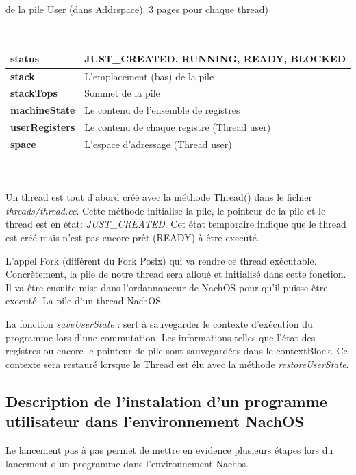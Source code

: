 \documentclass[a4paper,10pt]{article}
\begin{document}
de la pile
User (dans Addrspace). 3 pages pour chaque thread)

\vspace{0.3cm} \\
\begin{tabular}{|l|l|}
\hline 
 \textbf{status} & JUST\_CREATED, RUNNING, READY, BLOCKED \\ \hline 
 \textbf{stack}& L'emplacement (bas) de la pile \\ \hline
 \textbf{stackTops}& Sommet de la pile \\ \hline
 \textbf{machineState}&Le contenu de l'ensemble de registres \\ \hline
 \textbf{userRegisters} &Le contenu de chaque registre (Thread user) \\ \hline
 \textbf{space}& L'espace d'adressage (Thread user) \\ \hline
\end{tabular} \\
\vspace{0.2cm} \\

Un thread est tout d'abord créé avec la méthode Thread() dans le fichier 
\textit{threads/thread.cc}. Cette méthode initialise la pile, le pointeur de la 
pile et le thread est en état: \textit{JUST\_CREATED}. Cet état temporaire indique
que le thread est créé mais n'est pas encore prêt (READY) à être executé. 

L'appel Fork (différent du Fork Posix) qui va rendre ce
thread exécutable. Concrètement, la pile de notre thread sera alloué et 
initialisé dans cette fonction. Il va être ensuite mise dans l'ordannanceur de NachOS
pour qu'il puisse être executé. La pile d'un thread NachOS

La fonction \textit{saveUserState} : sert à sauvegarder le contexte d'exécution
du programme lors d'une commutation. Les informations telles que l'état des
registres ou encore le pointeur de pile sont sauvegardées dans le contextBlock.
Ce contexte sera restauré lorsque le Thread est élu avec la méthode
\textit{restoreUserState}.

\subsection{Description de l'instalation d'un programme utilisateur dans
l'environnement NachOS}

Le lancement pas à pas permet de mettre en evidence plusieurs étapes lors du
lancement d'un programme dans l'environnement Nachos.
\end{document}
